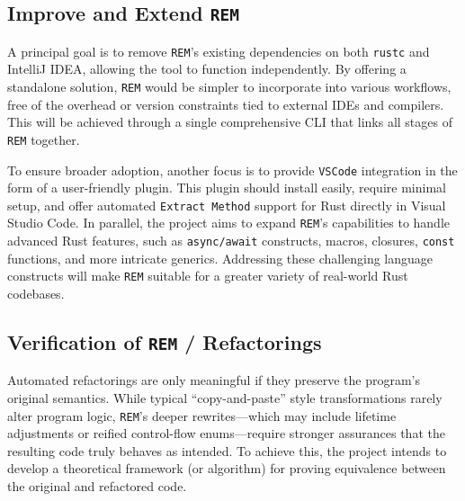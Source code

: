 \subsection{Improve and Extend \texttt{REM}}
\label{sec:improve-extend-rem}

A principal goal is to remove \texttt{REM}’s existing dependencies on both
\texttt{rustc} and IntelliJ IDEA, allowing the tool to function independently.
By offering a standalone solution, \texttt{REM} would be simpler to incorporate
into various workflows, free of the overhead or version constraints tied to
external IDEs and compilers. This will be achieved through a single
comprehensive CLI that links all stages of \texttt{REM} together.

To ensure broader adoption, another focus is to provide \texttt{VSCode}
integration in the form of a user-friendly plugin. This plugin should install
easily, require minimal setup, and offer automated \texttt{Extract Method}
support for Rust directly in Visual Studio Code. In parallel, the project aims
to expand \texttt{REM}’s capabilities to handle advanced Rust features, such as
\texttt{async/await} constructs, macros, closures, \texttt{const} functions, and
more intricate generics. Addressing these challenging language constructs will
make \texttt{REM} suitable for a greater variety of real-world Rust codebases.

\subsection{Verification of \texttt{REM} / Refactorings}
\label{sec:verification-rem}

Automated refactorings are only meaningful if they preserve the program’s
original semantics. While typical “copy-and-paste” style transformations rarely
alter program logic, \texttt{REM}’s deeper rewrites---which may include lifetime
adjustments or reified control-flow enums---require stronger assurances that the
resulting code truly behaves as intended. To achieve this, the project intends
to develop a theoretical framework (or algorithm) for proving equivalence
between the original and refactored code.

